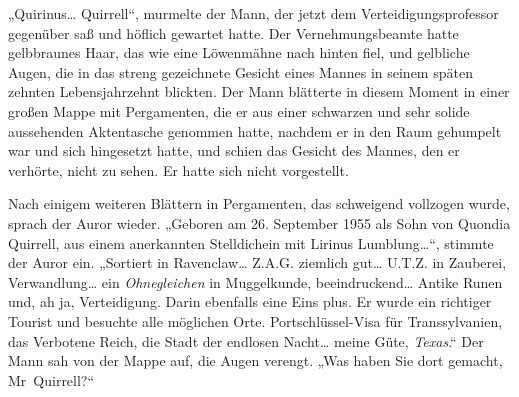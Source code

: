 „Quirinus… Quirrell“, murmelte der Mann, der jetzt dem Verteidigungsprofessor gegenüber saß und höflich gewartet hatte. Der Vernehmungsbeamte hatte gelbbraunes Haar, das wie eine Löwenmähne nach hinten fiel, und gelbliche Augen, die in das streng gezeichnete Gesicht eines Mannes in seinem späten zehnten Lebensjahrzehnt blickten. Der Mann blätterte in diesem Moment in einer großen Mappe mit Pergamenten, die er aus einer schwarzen und sehr solide aussehenden Aktentasche genommen hatte, nachdem er in den Raum gehumpelt war und sich hingesetzt hatte, und schien das Gesicht des Mannes, den er verhörte, nicht zu sehen. Er hatte sich nicht vorgestellt.

Nach einigem weiteren Blättern in Pergamenten, das schweigend vollzogen wurde, sprach der Auror wieder.
„Geboren am 26. September 1955 als Sohn von Quondia Quirrell, aus einem anerkannten Stelldichein mit Lirinus Lumblung…“, stimmte der Auror ein. „Sortiert in Ravenclaw… Z.A.G. ziemlich gut… U.T.Z. in Zauberei, Verwandlung… ein \emph{Ohnegleichen} in Muggelkunde, beeindruckend… Antike Runen und, ah ja, Verteidigung. Darin ebenfalls eine Eins plus. Er wurde ein richtiger Tourist und besuchte alle möglichen Orte. Portschlüssel-Visa für Transsylvanien, das Verbotene Reich, die Stadt der endlosen Nacht… meine Güte, \emph{Texas}.“
Der Mann sah von der Mappe auf, die Augen verengt.
„Was haben Sie dort gemacht, Mr~Quirrell?“

